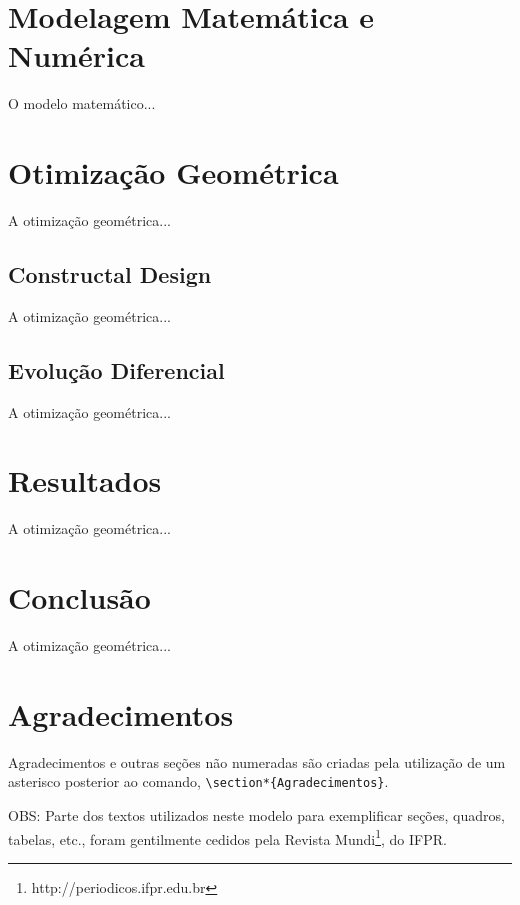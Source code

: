 \documentclass[12pt,A4,A4pt]{article}
\begin{document}
\section{Modelagem Matemática e Numérica}
\label{modelo}
\hspace{0.5cm}O modelo matemático...

\section{Otimização Geométrica}
\label{opt}
\hspace{0.5cm}A otimização geométrica...

\subsection{Constructal Design}
\label{ed}
\hspace{0.5cm}A otimização geométrica...


\subsection{Evolução Diferencial}
\label{ed}
\hspace{0.5cm}A otimização geométrica...

\section{Resultados}
\label{opt}
\hspace{0.5cm}A otimização geométrica...

\section{Conclusão}
\label{opt}
\hspace{0.5cm}A otimização geométrica...

\section*{Agradecimentos}
\hspace{0.5cm}Agradecimentos e outras seções não numeradas são criadas pela utilização de um asterisco posterior ao comando, \verb|\section*{Agradecimentos}|.

OBS: Parte dos textos utilizados neste modelo para exemplificar seções, quadros, tabelas, etc., foram gentilmente cedidos pela Revista Mundi\footnote{http://periodicos.ifpr.edu.br}, do IFPR.




\end{document}
